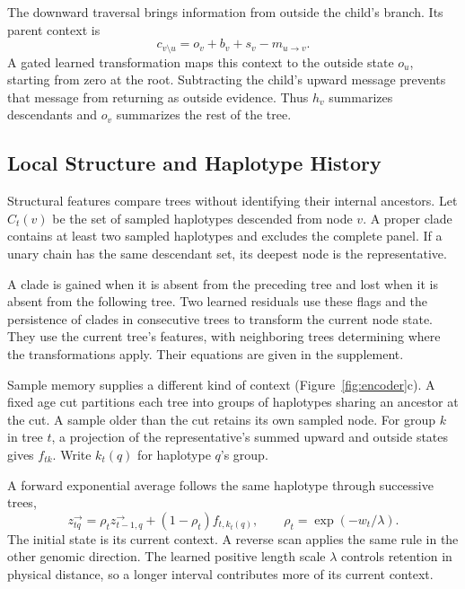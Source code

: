 \documentclass[letterpaper]{article}
\begin{document}
The downward traversal brings information from outside the child's branch. Its parent context is
\begin{equation}
c_{v\setminus u}=o_v+b_v+s_v-m_{u\to v}.
\label{eq:outside}
\end{equation}
A gated learned transformation maps this context to the outside state $o_u$, starting from zero at the root. Subtracting the child's upward message prevents that message from returning as outside evidence. Thus $h_v$ summarizes descendants and $o_v$ summarizes the rest of the tree.

\subsection{Local Structure and Haplotype History}
\label{sec:structure}
Structural features compare trees without identifying their internal ancestors. Let $C_t(v)$ be the set of sampled haplotypes descended from node $v$. A proper clade contains at least two sampled haplotypes and excludes the complete panel. If a unary chain has the same descendant set, its deepest node is the representative.

A clade is gained when it is absent from the preceding tree and lost when it is absent from the following tree. Two learned residuals use these flags and the persistence of clades in consecutive trees to transform the current node state. They use the current tree's features, with neighboring trees determining where the transformations apply. Their equations are given in the supplement.

Sample memory supplies a different kind of context (Figure~\ref{fig:encoder}c). A fixed age cut partitions each tree into groups of haplotypes sharing an ancestor at the cut. A sample older than the cut retains its own sampled node. For group $k$ in tree $t$, a projection of the representative's summed upward and outside states gives $f_{tk}$. Write $k_t(q)$ for haplotype $q$'s group.

A forward exponential average follows the same haplotype through successive trees,
\begin{equation}
z^\rightarrow_{tq}
=\rho_t z^\rightarrow_{t-1,q}
 +(1-\rho_t)f_{t,k_t(q)},
\qquad
\rho_t=\exp(-w_t/\lambda).
\label{eq:memory}
\end{equation}
The initial state is its current context. A reverse scan applies the same rule in the other genomic direction. The learned positive length scale $\lambda$ controls retention in physical distance, so a longer interval contributes more of its current context.
\end{document}
